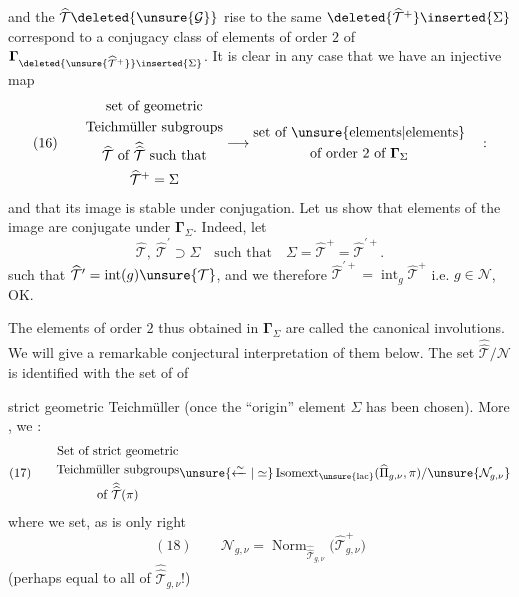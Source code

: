 

and the $\widehat{\mathcal{T}}\deleted{\unsure{\mathcal G}}$  rise to the same $\deleted{\widehat{\mathcal{T}}^{+}}\inserted{\Sigma}$ correspond  to a conjugacy class of elements of order $2$ of $\boldsymbol{\Gamma}_{\deleted{\unsure{\widehat{\mathcal{T}}^{+}}}\inserted{\Sigma}}$. It is clear  in any case that we have an injective map
\[
(16)\qquad
\begin{gathered}
\text{set of geometric}\\
\text{Teichmüller subgroups}\\
\widehat{\mathcal{T}}\text{ of }\widehat{\widehat{\mathcal{T}}}\text{ such that}\\
\widehat{\mathcal{T}}^{+}=\Sigma
\end{gathered}
\longrightarrow
\begin{gathered}
\text{set of }\unsure{\text{elements}|\text{elements}}\\
\text{of order }2\text{ of }\boldsymbol{\Gamma}_{\Sigma}
\end{gathered}
\quad :
\]
and that its image is stable under conjugation. Let us show that  elements of the image are conjugate under $\boldsymbol{\Gamma}_{\Sigma}$. Indeed, let
\[
\widehat{\mathcal{T}},\ \widehat{\mathcal{T}}^{\prime}\supset\Sigma
\quad\text{such that}\quad
\Sigma=\widehat{\mathcal{T}}^{+}=\widehat{\mathcal{T}}^{\prime+}.
\]
such that
$\widehat{\mathcal{T}}^{\prime}=\operatorname{int}(g)\unsure{\mathcal{T}}$,
and we  therefore
$\widehat{\mathcal{T}}^{\prime+}=\operatorname{int}_{g}\widehat{\mathcal{T}}^{+}$
i.e. $g\in\mathcal{N}$, OK.

The elements of order $2$ thus obtained in $\boldsymbol{\Gamma}_{\Sigma}$ are called the canonical involutions. We will give a remarkable conjectural interpretation of them below. The set $\widehat{\widehat{\mathcal{T}}}/\mathcal{N}$ is identified with the set of  of



strict geometric Teichmüller (once the ``origin'' element $\Sigma$ has been chosen). More , we :
\[
(17)\qquad
\begin{gathered}
\text{Set of strict geometric}\\
\text{Teichmüller subgroups}\\
\text{of }\widehat{\widehat{\mathcal{T}}}(\pi)
\end{gathered}
\unsure{\xleftarrow{\sim}|\simeq}
\operatorname{Isomext}_{\unsure{\mathrm{lac}}}
(\widehat{\Pi}_{g,\nu},\pi)/\unsure{\mathcal{N}_{g,\nu}}
\]
where we set, as is only right
\[
(18)\qquad
\mathcal{N}_{g,\nu}
=\operatorname{Norm}_{\widehat{\widehat{\mathcal{T}}}_{g,\nu}}
\bigl(\widehat{\mathcal{T}}_{g,\nu}^{+}\bigr)
\]
(perhaps equal to all of $\widehat{\widehat{\mathcal{T}}}_{g,\nu}$!)

